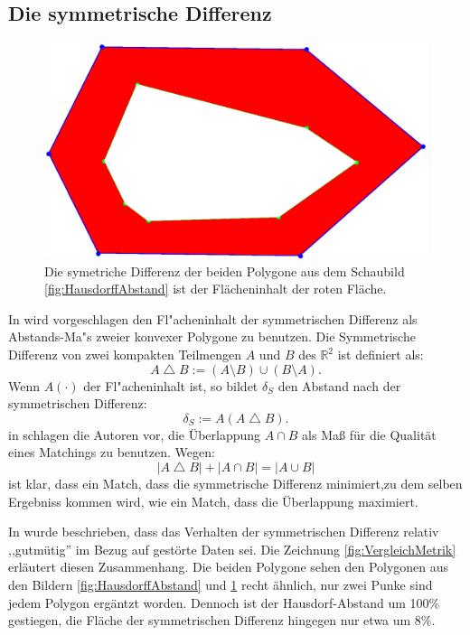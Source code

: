 \subsection{Die symmetrische Differenz}\label{symDiff}
\begin{figure}
	\centering
	\includegraphics[scale=.6]{SymDiff.eps}
	\caption[Die symmetrische Differenz zweier Polygone]{Die symetriche Differenz der beiden Polygone aus dem Schaubild \ref{fig:HausdorffAbstand} ist der Flächeninhalt der roten Fläche.}
	\label{fig:SymDiffBild}
\end{figure}

In \cite{AFRW} wird vorgeschlagen den Fl"acheninhalt der symmetrischen Differenz als Abstands-Ma"s zweier konvexer Polygone zu benutzen. Die Symmetrische Differenz von zwei kompakten Teilmengen $A$ und $B$ des $\mathbb{R}^2 $ ist definiert als:
\[A\bigtriangleup B:=(A\setminus B)\cup(B\setminus A).\]
Wenn $A(\cdot)$ der Fl"acheninhalt ist, so bildet $\delta_S$ den Abstand nach der symmetrischen Differenz:
\[\delta_S:=A(A \bigtriangleup B).\]
in \cite{TG} schlagen die Autoren vor, die Überlappung $A\cap B$ als Maß für die Qualität eines Matchings zu benutzen. Wegen:
$$|A\bigtriangleup B|+|A\cap B|=|A\cup B|$$
ist klar, dass ein Match, dass die symmetrische Differenz minimiert,zu dem selben Ergebniss kommen wird, wie ein Match, dass die Überlappung maximiert.

In \cite{AFRW} wurde beschrieben, dass das Verhalten der symmetrischen Differenz relativ ,,gutmütig'' im Bezug auf gestörte Daten sei. Die Zeichnung \ref{fig:VergleichMetrik} erläutert diesen Zusammenhang. Die beiden Polygone sehen den Polygonen aus den Bildern \ref{fig:HausdorffAbstand} und \ref{fig:SymDiffBild} recht ähnlich, nur zwei Punke sind jedem Polygon ergäntzt worden. Dennoch ist der Hausdorf-Abstand um 100\% gestiegen, die Fläche der symmetrischen Differenz hingegen nur etwa um 8\%.

